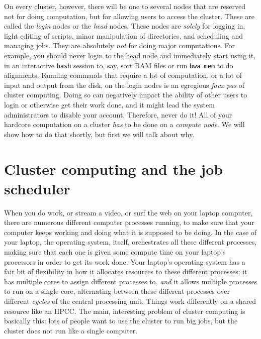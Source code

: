 \documentclass[]{krantz}
\begin{document}
On every cluster, however, there will be one to several nodes that are reserved not for
doing computation, but for allowing users to access the cluster. These are called the
\emph{login} nodes or the \emph{head} nodes. These nodes are \emph{solely} for logging in, light editing of
scripts, minor manipulation of directories, and scheduling and managing jobs. They are absolutely \emph{not}
for doing major computations. For example, you should never login to the head node and immediately
start using it, in an interactive \texttt{bash} session to, say, sort BAM files or run \texttt{bwa\ mem}
to do alignments. Running commands that require a lot of computation, or a lot of
input and output from the disk, on the login nodes is an egregious
\emph{faux pas} of cluster computing. Doing so can
negatively impact the ability of other users to login or otherwise get their work done, and it
might lead the system administrators to disable your account. Therefore,
never do it! All of your hardcore computation on a cluster \emph{has} to be done on
a \emph{compute node}. We will show how to do that shortly, but first we will talk about why.

\hypertarget{cluster-computing-and-the-job-scheduler}{%
\section{Cluster computing and the job scheduler}\label{cluster-computing-and-the-job-scheduler}}

When you do work, or stream a video, or surf the web on your laptop computer, there are numerous
different computer processes running, to make sure that your computer keeps working and doing what it
is supposed to be doing. In the case of your laptop, the operating system, itself, orchestrates
all these different processes, making sure that each one is given some compute time on your
laptop's processors in order to get its work done. Your laptop's operating system has a fair bit
of flexibility in how it allocates resources to these different processes: it has multiple
cores to assign different processes to, \emph{and} it
allows multiple processes to run on a single core, alternating between these different processes over
different \emph{cycles} of the central processing unit. Things work differently
on a shared resource like an HPCC. The main, interesting problem of cluster computing is basically
this: lots of people want to use the cluster to run big jobs, but the cluster does not
run like a single computer.
\end{document}
